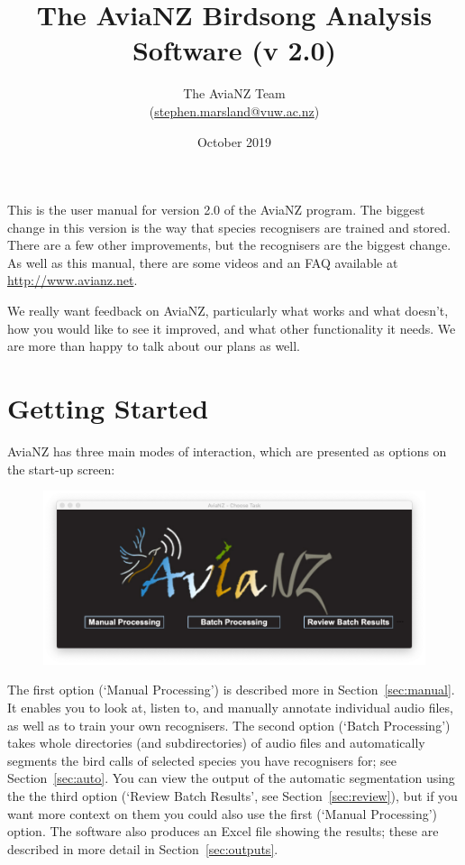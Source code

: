 \documentclass{article}
\title{The AviaNZ Birdsong Analysis Software (v 2.0)}
\author{The AviaNZ Team \\(\url{stephen.marsland@vuw.ac.nz})}
\date{October 2019}
\begin{document}
\maketitle

This is the user manual for version 2.0 of the AviaNZ program. The biggest change in this version is the way that species recognisers are trained and stored. There are a few other improvements, but the recognisers are the biggest change.
As well as this manual, there are some videos and an FAQ available at \url{http://www.avianz.net}.
 
We really want feedback on AviaNZ, particularly what works and what doesn't, how you would like to see it improved, and what other functionality it needs. We are more than happy to talk about our plans as well. 

\tableofcontents


\section{Getting Started}


AviaNZ has three main modes of interaction, which are presented as options on the start-up screen:

\begin{figure}[h!]
\centering
\includegraphics[width=.3\textwidth]{Figs/splashscreen}
\label{welcome}
\end{figure}

The first option (`Manual Processing') is described more in Section~\ref{sec:manual}. It enables you to look at, listen to, and manually annotate individual audio files, as well as to train your own recognisers. The second option (`Batch Processing') takes whole directories (and subdirectories) of audio files and automatically segments the bird calls of selected species you have recognisers for; see Section~\ref{sec:auto}. You can view the output of the automatic segmentation using the the third option (`Review Batch Results', see Section~\ref{sec:review}), but if you want more context on them you could also use the first (`Manual Processing') option. 
The software also produces an Excel file showing the results; these are described in more detail in Section~\ref{sec:outputs}. 
\end{document}

